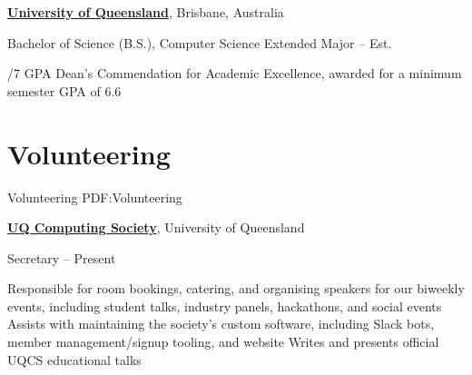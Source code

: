 \documentclass[a4paper,10pt,oneside]{article}
\begin{document}
\begin{body}
\href{https://www.uq.edu.au/}{\textbf{University of Queensland}}, Brisbane, Australia
\par Bachelor of Science (B.S.), Computer Science Extended Major\hfill {} -- Est. 
\begin{detail}
/7 GPA
\BulletItem Dean's Commendation for Academic Excellence, awarded for a minimum semester GPA of 6.6 \hfill {}
\end{detail}




\section
{Volunteering}
{Volunteering}
{PDF:Volunteering}

\href{https://uqcs.org.au/}
{\textbf{UQ Computing Society}}, University of Queensland

\par Secretary\hfill {} -- Present

\begin{detail}
\BulletItem Responsible for room bookings, catering, and organising speakers for our biweekly events, including student talks, industry panels, hackathons, and social events
\BulletItem Assists with maintaining the society's custom software, including Slack bots, member management/signup tooling, and website
\BulletItem Writes and presents official UQCS educational talks
\end{detail}


\end{body}
\end{document}
